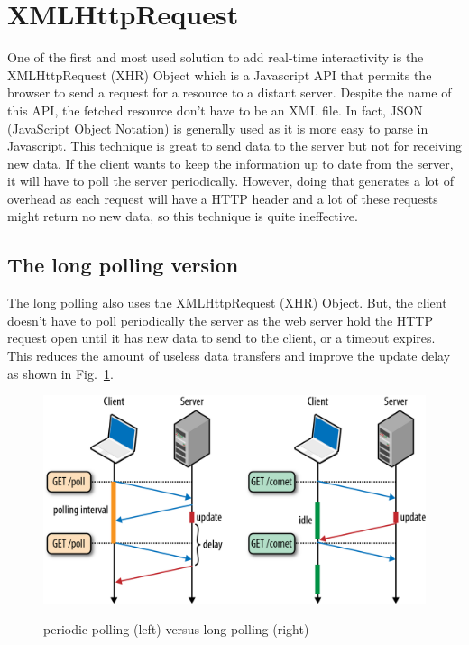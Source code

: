 \documentclass[journal,compsoc]{IEEEtran}
\begin{document}
\section{XMLHttpRequest}

One of the first and most used solution to add real-time interactivity is the XMLHttpRequest (XHR) Object which is a Javascript API that permits the browser to send a request for a resource to a distant server.
Despite the name of this API, the fetched resource don't have to be an XML file.
In fact, JSON (JavaScript Object Notation) is generally used as it is more easy to parse in Javascript.
This technique is great to send data to the server but not for receiving new data.
If the client wants to keep the information up to date from the server, it will have to poll the server periodically.
However, doing  that generates a lot of overhead as each request will have a HTTP header and a lot of these requests might return no new data, so this technique is quite ineffective.

\subsection{The long polling version}

The long polling also uses the XMLHttpRequest (XHR) Object.
But, the client doesn't have to poll periodically the server as the web server hold the HTTP request open until it has new data to send to the client, or a timeout expires.
This reduces the amount of useless data transfers and improve the update delay as shown in Fig.~\ref{poll_vs_lpoll}.

\begin{figure}
  \centering
  \includegraphics[width=\linewidth]{poll_vs_lpoll}
  \label{poll_vs_lpoll}
  \caption{periodic polling (left) versus long polling (right)}
\end{figure}
\end{document}
